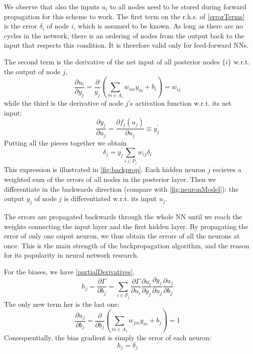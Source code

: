 \documentclass[twoside,english]{uiofysmaster}
\begin{document}
We observe that also the inputs $u_i$ to all nodes need to be stored during forward propagation for 
this scheme to work. 
The first term on the r.h.s. of \eqref{errorTerms} is the error $\delta_i$ of node $i$, which is assumed to be known. 
As long as there are no cycles in the network, there is an ordering
of nodes from the output back to the input that respects this condition. It is
therefore valid only for feed-forward NNs.

The second term is the derivative of the net input of all posterior
nodes $\{i\}$ w.r.t. the output of node $j$,
\begin{equation}
 \frac{\partial u_i}{\partial y_j} = \frac{\partial}{y_j}\left(\sum_{m\in A_i} w_{im}y_m + b_i\right) = w_{ij}
\end{equation}
while the third is the derivative of node $j$'s activation function w.r.t. its net input:
\begin{equation}
 \frac{\partial y_j}{\partial u_j} = \frac{\partial f_j(u_j)}{\partial u_j} \equiv y^\prime_j
\end{equation}
Putting all the pieces together we obtain
\begin{equation}
 \delta_j = y^\prime_j\sum_{i\in P_j}w_{ij} \delta_i 
 \label{backprop}
\end{equation}
This expression is illustrated in \autoref{fig:backprop}.  
Each hidden neuron $j$ recieves a weighted sum
of the errors of all nodes in the posterior layer. Then we differentiate in the backwards direction (compare with 
\autoref{fig:neuronModel}): 
the output $y_j$ of node $j$ is differentiated w.r.t. its input $u_j$. 

The errors are propagated backwards through the whole NN until we reach the weights connecting the input layer
and the first hidden layer. 
By propagating the error
of only one ouput neuron, we thus obtain the errors of all the neurons at once. This is the main strength of the backpropagation
algorithm, and the reason for its popularity in neural network research. 

\noindent For the biases, we have \eqref{partialDerivatives},
\begin{equation}
 h_j = \frac{\partial \Gamma}{\partial b_j} = \sum_{i\in P_j} \frac{\partial \Gamma}{\partial u_i}
	      \frac{\partial u_i}{\partial y_j} \frac{\partial y_j}{\partial u_j} \frac{\partial u_j}{\partial b_j}
\end{equation}
The only new term her is the last one:
\begin{equation}
 \frac{\partial u_j}{\partial b_j} = \frac{\partial}{\partial b_j}\left(\sum_{m\in A_j} w_{jm}y_m + b_j\right) = 1
\end{equation}
Consequentially, the bias gradient is simply the error of each neuron:
\begin{equation}
 h_j = \delta_j
\end{equation}
\end{document}
